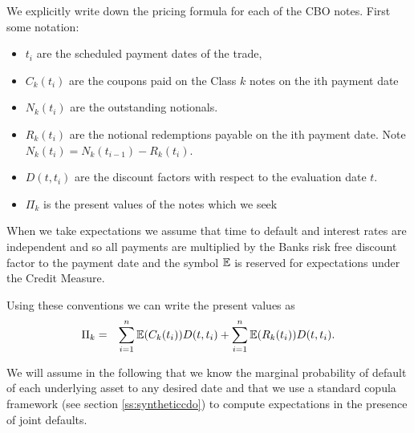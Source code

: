 We explicitly write down the pricing formula for each of the CBO notes. First some notation:
\begin{itemize}
\item $t_i$ are the scheduled payment dates of the trade, 
\item $C_{k}(t_i)$  are the coupons paid on the Class $k$ notes on the ith payment date
\item $N_{k}(t_i)$  are the outstanding notionals.
\item $R_k(t_i)$  are the notional redemptions payable on the ith payment date. Note $N_k(t_i)=N_k(t_{i-1})-R_k(t_i)$.
\item $D(t,t_i)$ are the discount factors with respect to the evaluation date $t$.
\item $\Pi_k$ is the present values of the notes which we seek
\end{itemize}

When we take expectations we assume that time to default and interest rates are independent and so all payments are multiplied 
by the Banks risk free discount factor to the payment date and the symbol $\operatorname{\mathbb{E}}$ is reserved for expectations under the Credit Measure.

Using these conventions we can write the present values as
\begin{eqnarray}
\Pi_k & = & \sum_{i=1}^n \operatorname{\mathbb{E}}(C_k(t_i))D(t,t_i) + \sum_{i=1}^n \operatorname{\mathbb{E}}(R_k(t_i))D(t,t_i).
\end{eqnarray}

We will assume in the following that we know the marginal probability of default of each underlying asset 
to any desired date and that we use a standard copula framework (see section \ref{ss:syntheticcdo}) to compute expectations in the presence of joint defaults.




